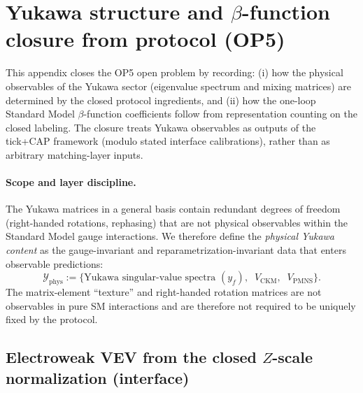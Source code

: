 \section{Yukawa structure and \texorpdfstring{$\beta$}{beta}-function closure from protocol (OP5)}
\label{app:yukawa_beta_protocol_closure}

This appendix closes the OP5 open problem by recording:
(i) how the physical observables of the Yukawa sector (eigenvalue spectrum and mixing matrices) are determined by the closed protocol ingredients,
and (ii) how the one-loop Standard Model $\beta$-function coefficients follow from representation counting on the closed labeling.
The closure treats Yukawa observables as outputs of the tick+CAP framework (modulo stated interface calibrations), rather than as arbitrary matching-layer inputs.

\paragraph{Scope and layer discipline.}
\AuditTag The Yukawa matrices in a general basis contain redundant degrees of freedom (right-handed rotations, rephasing) that are not physical observables within the Standard Model gauge interactions.
We therefore define the \emph{physical Yukawa content} as the gauge-invariant and reparametrization-invariant data that enters observable predictions:
\begin{equation}\label{eq:yukawa_physical_observables}
\mathcal{Y}_{\mathrm{phys}} := \bigl\{\text{Yukawa singular-value spectra }(y_f),\;\; V_{\mathrm{CKM}},\;\; V_{\mathrm{PMNS}}\bigr\}.
\end{equation}
The matrix-element ``texture'' and right-handed rotation matrices are not observables in pure SM interactions and are therefore not required to be uniquely fixed by the protocol.

\subsection{Electroweak VEV from the closed $Z$-scale normalization (interface)}
\label{subsec:vev_from_closed_ew}

